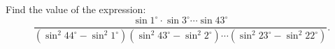 Find the value of the expression: \[\dfrac{\sin{1^{\circ}}\cdot\sin{3^{\circ}}\cdots\sin{43^{\circ}}}{(\sin^{2}{44^{\circ}}-\sin^{2}{1^{\circ}})(\sin^{2}{43^{\circ}}-\sin^{2}{2^{\circ}})\cdots(\sin^{2}{23^{\circ}}-\sin^{2}{22^{\circ}})}.\]
